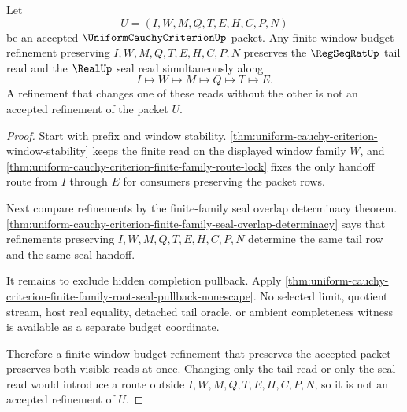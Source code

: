 \begin{theorem}
\label{thm:uniform-cauchy-criterion-regseq-real-window-budget-compatibility}
Let
$$
U=(I,W,M,Q,T,E,H,C,P,N)
$$
be an accepted $\UniformCauchyCriterionUp$ packet. Any finite-window budget
refinement preserving $I,W,M,Q,T,E,H,C,P,N$ preserves the $\RegSeqRatUp$ tail
read and the $\RealUp$ seal read simultaneously along
$$
I \longmapsto W \longmapsto M \longmapsto Q \longmapsto T \longmapsto E.
$$
A refinement that changes one of these reads without the other is not an
accepted refinement of the packet $U$.
\end{theorem}
\begin{proof}
Start with prefix and window stability.
\autoref{thm:uniform-cauchy-criterion-window-stability} keeps the finite read
on the displayed window family $W$, and
\autoref{thm:uniform-cauchy-criterion-finite-family-route-lock} fixes the only
handoff route from $I$ through $E$ for consumers preserving the packet rows.

Next compare refinements by the finite-family seal overlap determinacy theorem.
\autoref{thm:uniform-cauchy-criterion-finite-family-seal-overlap-determinacy}
says that refinements preserving $I,W,M,Q,T,E,H,C,P,N$ determine the same
tail row and the same seal handoff.

It remains to exclude hidden completion pullback. Apply
\autoref{thm:uniform-cauchy-criterion-finite-family-root-seal-pullback-nonescape}.
No selected limit, quotient stream, host real equality, detached tail oracle, or
ambient completeness witness is available as a separate budget coordinate.

Therefore a finite-window budget refinement that preserves the accepted packet
preserves both visible reads at once. Changing only the tail read or only the
seal read would introduce a route outside $I,W,M,Q,T,E,H,C,P,N$, so it is not an
accepted refinement of $U$.
\end{proof}

